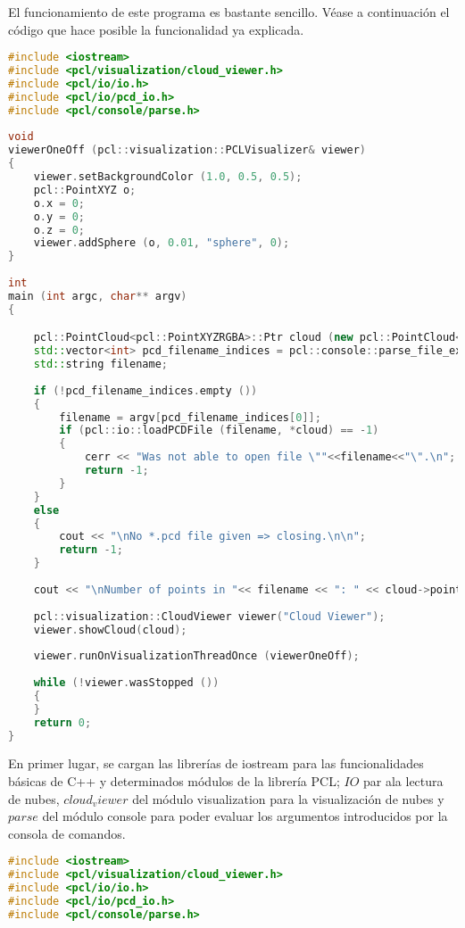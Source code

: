 El funcionamiento de este programa es bastante sencillo. Véase a continuación el código que hace posible la funcionalidad ya explicada.


\begin{lstlisting}[language=C++,breaklines]
#include <iostream>
#include <pcl/visualization/cloud_viewer.h>
#include <pcl/io/io.h>
#include <pcl/io/pcd_io.h>
#include <pcl/console/parse.h>
    
void 
viewerOneOff (pcl::visualization::PCLVisualizer& viewer)
{
    viewer.setBackgroundColor (1.0, 0.5, 0.5);
    pcl::PointXYZ o;
    o.x = 0;
    o.y = 0;
    o.z = 0;
    viewer.addSphere (o, 0.01, "sphere", 0); 
}
    
int 
main (int argc, char** argv)
{   

    pcl::PointCloud<pcl::PointXYZRGBA>::Ptr cloud (new pcl::PointCloud<pcl::PointXYZRGBA>);
    std::vector<int> pcd_filename_indices = pcl::console::parse_file_extension_argument (argc, argv, "pcd"); 
    std::string filename;
     
    if (!pcd_filename_indices.empty ())
    {
    	filename = argv[pcd_filename_indices[0]];
    	if (pcl::io::loadPCDFile (filename, *cloud) == -1)
    	{
      		cerr << "Was not able to open file \""<<filename<<"\".\n";
      		return -1;
    	}
    }
    else
    {
    	cout << "\nNo *.pcd file given => closing.\n\n";
    	return -1;
    }
    
    cout << "\nNumber of points in "<< filename << ": " << cloud->points.size() << "\n";
        
    pcl::visualization::CloudViewer viewer("Cloud Viewer");
    viewer.showCloud(cloud);
    
    viewer.runOnVisualizationThreadOnce (viewerOneOff);
    
    while (!viewer.wasStopped ())
    {
    }
    return 0;
}
\end{lstlisting}


En primer lugar, se cargan las librerías de iostream para las funcionalidades básicas de C++ y determinados módulos de la librería PCL; $IO$ par ala lectura de nubes, $cloud_viewer$ del módulo visualization para la visualización de nubes y $parse$ del módulo console para poder evaluar los argumentos introducidos por la consola de comandos.

\begin{lstlisting}[language=C++,breaklines]
#include <iostream>
#include <pcl/visualization/cloud_viewer.h>
#include <pcl/io/io.h>
#include <pcl/io/pcd_io.h>
#include <pcl/console/parse.h>
\end{lstlisting}


